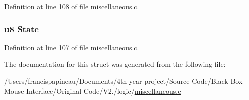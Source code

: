 \-Definition at line 108 of file miscellaneous.\-c.

\hypertarget{structnumstore_a35c66c877f571457e71e669b0c64d5b0}{
\subsubsection[{\-State}]{\setlength{\rightskip}{0pt plus 5cm}u8 {\bf \-State}}}\label{structnumstore_a35c66c877f571457e71e669b0c64d5b0}


\-Definition at line 107 of file miscellaneous.\-c.



\-The documentation for this struct was generated from the following file\-:\begin{DoxyCompactItemize}
\item 
/\-Users/francispapineau/\-Documents/4th year project/\-Source Code/\-Black-\/\-Box-\/\-Mouse-\/\-Interface/\-Original Code/\-V2./logic/\hyperlink{miscellaneous_8c}{miscellaneous.\-c}\end{DoxyCompactItemize}
